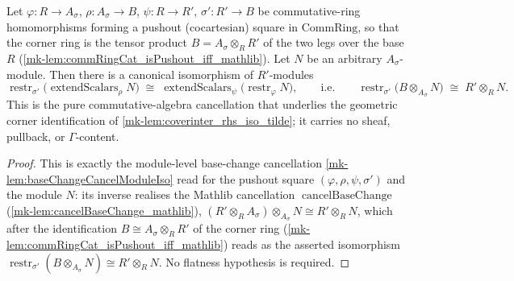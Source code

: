 \begin{lemma}\label{mk-lem:coverinter_baseChanged_module_iso_tensor}
  \leanok

  Let \(\varphi : R \to A_\sigma\), \(\rho : A_\sigma \to B\), \(\psi : R \to R'\),
  \(\sigma' : R' \to B\) be commutative-ring homomorphisms forming a pushout (cocartesian)
  square in \(\mathrm{CommRing}\), so that the corner ring is the tensor product
  \(B = A_\sigma \otimes_R R'\) of the two legs over the base \(R\)
  (\ref{mk-lem:commRingCat_isPushout_iff_mathlib}). Let \(N\) be an arbitrary
  \(A_\sigma\)-module. Then there is a canonical isomorphism of \(R'\)-modules
  \[
    \operatorname{restr}_{\sigma'}\bigl(\operatorname{extendScalars}_\rho N\bigr)
      \;\cong\;
    \operatorname{extendScalars}_\psi\bigl(\operatorname{restr}_\varphi N\bigr),
    \qquad\text{i.e.}\qquad
    \operatorname{restr}_{\sigma'}\bigl(B \otimes_{A_\sigma} N\bigr)
      \;\cong\; R' \otimes_R N.
  \]
  This is the pure commutative-algebra cancellation that underlies the geometric corner
  identification of \ref{mk-lem:coverinter_rhs_iso_tilde}; it carries no sheaf, pullback, or
  \(\Gamma\)-content.
\end{lemma}
\begin{proof}
  This is exactly the module-level base-change cancellation \ref{mk-lem:baseChangeCancelModuleIso}
  read for the pushout square \((\varphi, \rho, \psi, \sigma')\) and the module \(N\): its
  inverse realises the Mathlib cancellation \(\operatorname{cancelBaseChange}\)
  (\ref{mk-lem:cancelBaseChange_mathlib}),
  \((R' \otimes_R A_\sigma) \otimes_{A_\sigma} N \cong R' \otimes_R N\), which after the
  identification \(B \cong A_\sigma \otimes_R R'\) of the corner ring
  (\ref{mk-lem:commRingCat_isPushout_iff_mathlib}) reads as the asserted isomorphism
  \(\operatorname{restr}_{\sigma'}(B \otimes_{A_\sigma} N) \cong R' \otimes_R N\). No flatness
  hypothesis is required.
\end{proof}

